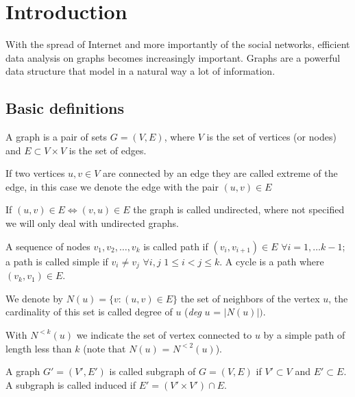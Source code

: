 
\chapter{Introduction}

With the spread of Internet and more importantly of the social networks, efficient data analysis on graphs becomes increasingly important.
Graphs are a powerful data structure that model in a natural way a lot of information. 


\section{Basic definitions}

\begin{definizione}\label{def:graph}
    A graph is a pair of sets $G=(V,E)$, where $V$ is the set of vertices (or nodes) and $E \subset V \times V$ is the set of edges.
\end{definizione}

If two vertices $u, v \in V$ are connected by an edge they are called extreme of the edge, in this case we denote the edge with the pair $(u, v) \in E$

If $(u,v) \in E \Leftrightarrow (v,u) \in E$ the graph is called undirected, where not specified we will only deal with undirected graphs.

A sequence of nodes  $v_{1}, v_{2}, \ldots, v_{k}$ is called path if $(v_{i}, v_{i+1}) \in E$ $\forall i = 1, \ldots k-1$; a path is called simple if $v_{i} \neq v_{j}$ $\forall i,j$ $1 \leq i < j \leq k$. A cycle is a path where $(v_{k}, v_{1}) \in E$.

We denote by $N(u) = \{ v : (u,v) \in E \}$ the set of neighbors of the vertex $u$, the cardinality of this set is called degree of $u$ (\textit{deg} $u$ = $|N(u)|)$. 

With $N^{<k}(u)$ we indicate the set of vertex connected to $u$ by a simple path of length less than $k$ (note that $N(u)$ = $N^{<2}(u)$).


\begin{definizione}\label{def:subgraph}
    A graph $G' = (V', E')$ is called subgraph of $G=(V,E)$ if $V' \subset V$ and $E' \subset E$. A subgraph is called induced if $E' = (V' \times V') \cap E$.
\end{definizione}

